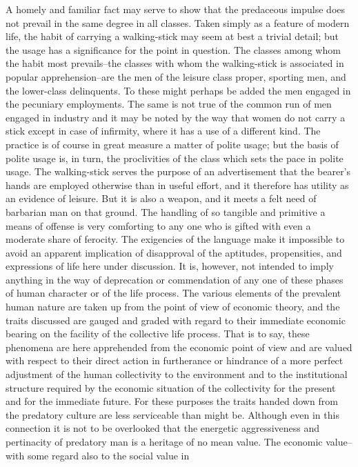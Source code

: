 \documentclass[12pt]{report}
\begin{document}
A homely and familiar fact may serve to show that the predaceous impulse
does not prevail in the same degree in all classes. Taken simply as a
feature of modern life, the habit of carrying a walking-stick may seem
at best a trivial detail; but the usage has a significance for the point
in question. The classes among whom the habit most prevails--the classes
with whom the walking-stick is associated in popular apprehension--are
the men of the leisure class proper, sporting men, and the lower-class
delinquents. To these might perhaps be added the men engaged in the
pecuniary employments. The same is not true of the common run of men
engaged in industry and it may be noted by the way that women do not
carry a stick except in case of infirmity, where it has a use of a
different kind. The practice is of course in great measure a matter
of polite usage; but the basis of polite usage is, in turn, the
proclivities of the class which sets the pace in polite usage. The
walking-stick serves the purpose of an advertisement that the bearer's
hands are employed otherwise than in useful effort, and it therefore has
utility as an evidence of leisure. But it is also a weapon, and it meets
a felt need of barbarian man on that ground. The handling of so tangible
and primitive a means of offense is very comforting to any one who is
gifted with even a moderate share of ferocity. The exigencies of
the language make it impossible to avoid an apparent implication of
disapproval of the aptitudes, propensities, and expressions of life here
under discussion. It is, however, not intended to imply anything in the
way of deprecation or commendation of any one of these phases of human
character or of the life process. The various elements of the prevalent
human nature are taken up from the point of view of economic theory,
and the traits discussed are gauged and graded with regard to their
immediate economic bearing on the facility of the collective life
process. That is to say, these phenomena are here apprehended from
the economic point of view and are valued with respect to their direct
action in furtherance or hindrance of a more perfect adjustment of the
human collectivity to the environment and to the institutional structure
required by the economic situation of the collectivity for the present
and for the immediate future. For these purposes the traits handed down
from the predatory culture are less serviceable than might be. Although
even in this connection it is not to be overlooked that the energetic
aggressiveness and pertinacity of predatory man is a heritage of no mean
value. The economic value--with some regard also to the social value in
\end{document}
